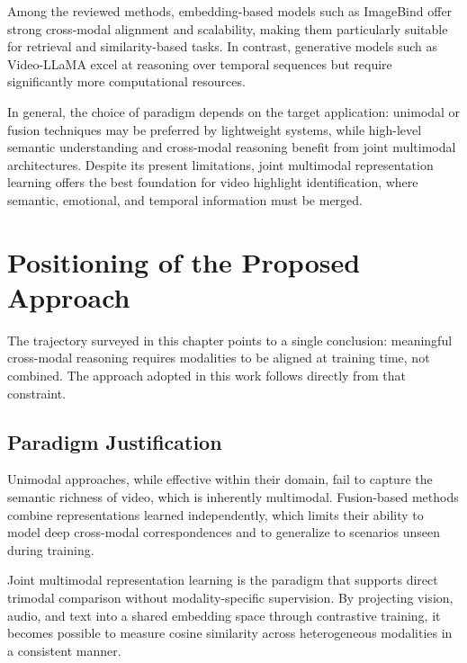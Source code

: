 \documentclass[12pt,a4paper,oneside,english]{book}
\begin{document}
Among the reviewed methods, embedding-based models such as ImageBind offer strong cross-modal alignment and scalability, making them particularly suitable for retrieval and similarity-based tasks. In contrast, generative models such as Video-LLaMA excel at reasoning over temporal sequences but require significantly more computational resources.

In general, the choice of paradigm depends on the target application: unimodal or fusion techniques may be preferred by lightweight systems, while high-level semantic understanding and cross-modal reasoning benefit from joint multimodal architectures. Despite its present limitations, joint multimodal representation learning offers the best foundation for video highlight identification, where semantic, emotional, and temporal information must be merged.



\section{Positioning of the Proposed Approach}%
\label{sec:positioning}

The trajectory surveyed in this chapter points to a single conclusion: meaningful cross-modal reasoning requires modalities to be aligned at training time, not combined. The approach adopted in this work follows directly from that constraint.

\subsection{Paradigm Justification}
\label{subsec:paradigm_justif}

Unimodal approaches, while effective within their domain, fail to capture the semantic richness of video, which is inherently multimodal. 
Fusion-based methods combine representations learned independently, which limits their ability to model deep cross-modal correspondences and to generalize to scenarios unseen during training.

Joint multimodal representation learning is the paradigm that supports direct trimodal comparison without modality-specific supervision. 
By projecting vision, audio, and text into a shared embedding space through contrastive training, it becomes possible to measure cosine similarity across heterogeneous modalities in a consistent manner. 
\end{document}

